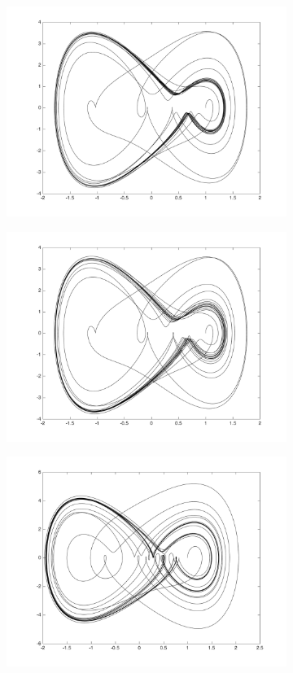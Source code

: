 \documentclass[%
 aip,12pt,
rsi,%
 amsmath,amssymb,
 reprint,%
]{revtex4-1}
\begin{document}
{\begin{figure}[t]
\centering
\begin{subfigure}{.5\textwidth}
  \includegraphics[width=.8\linewidth]{CD_A1.png}
\end{subfigure}%
\begin{subfigure}{.5\textwidth}
  \includegraphics[width=.8\linewidth]{CD_S1.png}
\end{subfigure}
\begin{subfigure}{.5\textwidth}
  \includegraphics[width=.8\linewidth]{CD_A2.png}

\end{subfigure}
\end{figure}}
\end{document}
